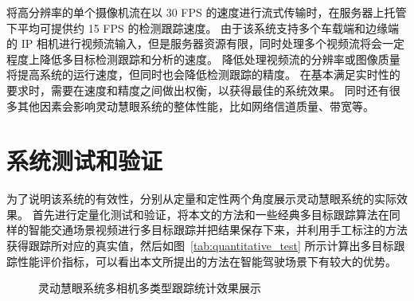 将高分辨率的单个摄像机流在以 30 FPS 的速度进行流式传输时，在服务器上托管下平均可提供约 15 FPS 的检测跟踪速度。
由于该系统支持多个车载端和边缘端的 IP 相机进行视频流输入，但是服务器资源有限，同时处理多个视频流将会一定程度上降低多目标检测跟踪和分析的速度。
降低处理视频流的分辨率或图像质量将提高系统的运行速度，但同时也会降低检测跟踪的精度。
在基本满足实时性的要求时，需要在速度和精度之间做出权衡，以获得最佳的系统效果。
同时还有很多其他因素会影响灵动慧眼系统的整体性能，比如网络信道质量、带宽等。




\section{系统测试和验证}
为了说明该系统的有效性，分别从定量和定性两个角度展示灵动慧眼系统的实际效果。
首先进行定量化测试和验证，将本文的方法和一些经典多目标跟踪算法在同样的智能交通场景视频进行多目标跟踪并把结果保存下来，并利用手工标注的方法获得跟踪所对应的真实值，然后如图~\ref{tab:quantitative_test} 所示计算出多目标跟踪性能评价指标，可以看出本文所提出的方法在智能驾驶场景下有较大的优势。

\vspace{0.5em}
\renewcommand\arraystretch{1.5}
\begin{figure}[htbp]
	\centering
	
	
	
	\centering
	\caption{灵动慧眼系统多相机多类型跟踪统计效果展示}
	\label{fig:system_present}
\end{figure}

